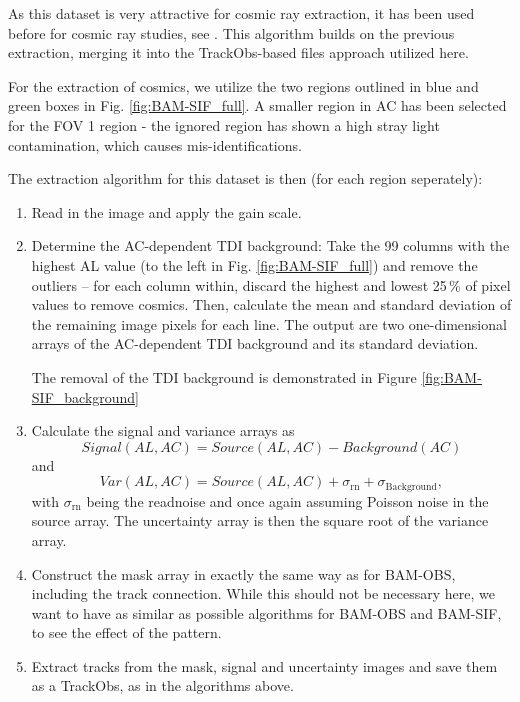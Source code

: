 \documentclass[a4paper, 11pt]{article}
\begin{document}
As this dataset is very attractive for cosmic ray extraction, it has been used before for cosmic ray studies, see \cite{GAIA-DE-TN-ESAC-RKO-033}. This algorithm builds on the previous extraction, merging it into the TrackObs-based files approach utilized here.

For the extraction of cosmics, we utilize the two regions outlined in blue and green boxes in Fig. \ref{fig:BAM-SIF_full}. A smaller region in AC has been selected for the FOV 1 region - the ignored region has shown a high stray light contamination, which causes mis-identifications.

The extraction algorithm for this dataset is then (for each region seperately):
\begin{enumerate}
  \item Read in the image and apply the gain scale.
  \item Determine the AC-dependent TDI background: Take the 99 columns with the highest AL value (to the left in Fig. \ref{fig:BAM-SIF_full}) and remove the outliers -- for each column within, discard the highest and lowest 25\,\% of pixel values to remove cosmics. Then, calculate the mean and standard deviation of the remaining image pixels for each line. The output are two one-dimensional arrays of the AC-dependent TDI background and its standard deviation.

    The removal of the TDI background is demonstrated in Figure \ref{fig:BAM-SIF_background}
  \item Calculate the signal and variance arrays as
    \begin{equation*}
      Signal\left( AL,AC \right) = Source\left( AL,AC \right) - Background\left(AC \right)
    \end{equation*}
    and
    \begin{equation*}
      Var\left( AL,AC \right) = Source\left( AL,AC \right) + \sigma_\mathrm{rn} + \sigma_\mathrm{Background},
    \end{equation*}
    with $\sigma_\mathrm{rn}$ being the readnoise and once again assuming Poisson noise in the source array. The uncertainty array is then the square root of the variance array.
  \item Construct the mask array in exactly the same way as for BAM-OBS, including the track connection. While this should not be necessary here, we want to have as similar as possible algorithms for BAM-OBS and BAM-SIF, to see the effect of the pattern.
  \item Extract tracks from the mask, signal and uncertainty images and save them as a TrackObs, as in the algorithms above.
\end{enumerate}
\end{document}
